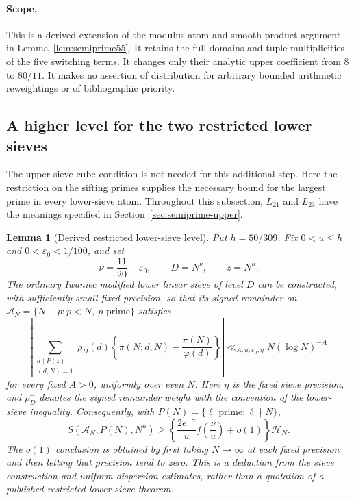 \documentclass[11pt]{article}
\newtheorem{lemma}[theorem]{Lemma}
\newcommand{\CN}{\mathcal C(N)}
\newcommand{\HN}{\mathcal H_N}
\begin{document}
\paragraph{Scope.}
This is a derived extension of the modulus-atom and smooth
product argument in Lemma~\ref{lem:semiprime55}.
It retains the full domains and tuple multiplicities of the
five switching terms. It changes only their analytic upper
coefficient from $8$ to $80/11$.
It makes no assertion of distribution for arbitrary bounded
arithmetic reweightings or of bibliographic priority.


\subsection{A higher level for the two restricted lower sieves}
\label{sec:restricted-lower-level}

The upper-sieve cube condition is not needed for this additional
step. Here the restriction on the sifting primes supplies the
necessary bound for the largest prime in every lower-sieve atom.
Throughout this subsection, $L_{21}$ and $L_{23}$ have the meanings
specified in Section~\ref{sec:semiprime-upper}.

\begin{lemma}[Derived restricted lower-sieve level]
\label{lem:restricted-lower-level}
Put $h=50/309$. Fix $0<u\le h$ and $0<\varepsilon_0<1/100$, and set
\[
 \nu=\frac{11}{20}-\varepsilon_0,\qquad
 D=N^\nu,\qquad z=N^u.
\]
The ordinary Iwaniec modified lower linear sieve of level $D$
can be constructed, with sufficiently small fixed precision, so
that its signed remainder on
$\mathcal A_N=\{N-p:p<N,\ p\text{ prime}\}$ satisfies
\begin{equation}\label{eq:restricted-lower-remainder}
 \left|\sum_{\substack{d\mid P(z)\\(d,N)=1}}
  \rho_D^-(d)
   \left\{\pi(N;d,N)-\frac{\pi(N)}{\varphi(d)}\right\}\right|
 \ll_{A,u,\varepsilon_0,\eta}N(\log N)^{-A}
\end{equation}
for every fixed $A>0$, uniformly over even $N$. Here $\eta$ is the
fixed sieve precision, and $\rho_D^-$ denotes the signed remainder
weight with the convention of the lower-sieve inequality.
Consequently, with $P(N)=\{\ell\text{ prime}:\ell\nmid N\}$,
\begin{equation}\label{eq:restricted-lower-main}
 S(\mathcal A_N;P(N),N^u)
 \ge \left\{\frac{2e^{-\gamma}}{u}
        f\left(\frac{\nu}{u}\right)+o(1)\right\}\HN.
\end{equation}
The $o(1)$ conclusion is obtained by first taking $N\to\infty$
at each fixed precision and then letting that precision tend to zero.
This is a deduction from the sieve construction and uniform
dispersion estimates, rather than a quotation of a published
restricted lower-sieve theorem.
\end{lemma}
\end{document}
